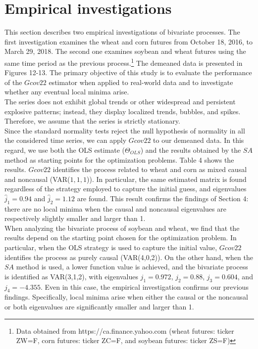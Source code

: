 \documentclass[<1p>]{elsarticle} %
\begin{document}
\section{Empirical investigations}
This section describes two empirical investigations of bivariate processes. The first investigation examines the wheat and corn futures from October 18, 2016, to March 29, 2018. The second one examines soybean and wheat futures using the same time period as the previous process.\footnote{Data obtained from https://ca.finance.yahoo.com (wheat futures: ticker ZW=F, corn futures: ticker ZC=F, and soybean futures: ticker ZS=F)} The demeaned data is presented in Figures 12-13. The primary objective of this study is to evaluate the performance of the $Gcov22$ estimator when applied to real-world data and to investigate whether any eventual local minima arise.\\
\indent The series does not exhibit global trends or other widespread and persistent explosive patterns; instead, they display localized trends, bubbles, and spikes. Therefore, we assume that the series is strictly stationary.\\
\indent Since the standard normality tests reject the null hypothesis of normality in all the considered time series, we can apply $Gcov22$ to our demeaned data. In this regard, we use both the OLS estimate ($\Theta_{OLS}$) and the results obtained by the $SA$ method as starting points for the optimization problems. Table 4 shows the results. $Gcov22$ identifies the process related to wheat and corn as mixed causal and noncausal (VAR($1,1,1$)). In particular, the same estimated matrix is found regardless of the strategy employed to capture the initial guess, and eigenvalues $\hat{j}_{1}=0.94$ and $\hat{j}_{2}=1.12$ are found. This result confirms the findings of Section 4: there are no local minima when the causal and noncausal eigenvalues are respectively slightly smaller and larger than 1.\\
\indent When analyzing the bivariate process of soybean and wheat, we find that the results depend on the starting point chosen for the optimization problem. In particular, when the OLS strategy is used to capture the initial value, $Gcov22$ identifies the process as purely causal (VAR(4,0,2)). On the other hand, when the $SA$ method is used, a lower function value is achieved, and the bivariate process is identified as VAR(3,1,2), with eigenvalues $j_1=0.972$, $j_2=0.88$, $j_3=0.604$, and $j_4=-4.355$. Even in this case, the empirical investigation confirms our previous findings. Specifically, local minima arise when either the causal or the noncausal or both eigenvalues are significantly smaller and larger than 1. 
\end{document}
